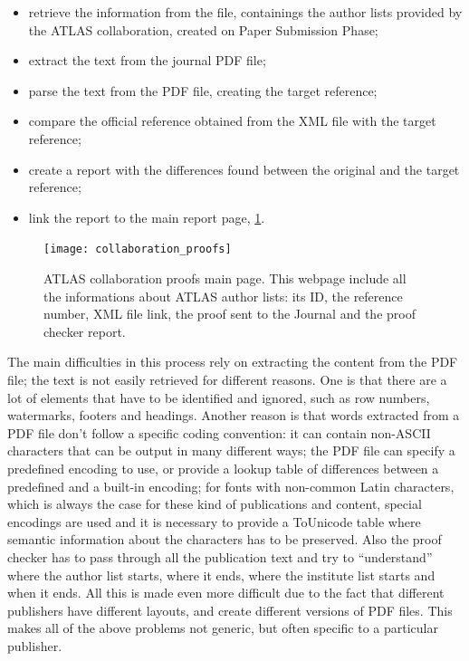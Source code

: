 \begin{itemize}
\item retrieve the information from the  file, containings the author lists provided by the ATLAS collaboration,  created on Paper Submission Phase;
\item extract the text from the journal PDF file;
\item parse the text from the PDF file, creating the target reference;
\item compare the official reference obtained from the XML file with the target reference;
\item create a report with the differences found between the original and the target reference;
\item link the report to the main report page, \cref{fig:collaboration_proofs}.
\end{itemize}

\begin{figure}[htb]
  \centering
  \texttt{[image: collaboration\_proofs]}
  \caption{ATLAS collaboration proofs main page. This webpage include all the informations about ATLAS author lists: its ID, the reference number, XML file link, the proof sent to the Journal and the proof checker report.}
  \label{fig:collaboration_proofs}
\end{figure}

The main difficulties in this process rely on extracting the content from the PDF file; the text is not easily retrieved for different reasons.
One is that there are a lot of elements that have to be identified and ignored, such as row numbers, watermarks, footers and headings.
Another reason is that words extracted from a PDF file don't follow a specific coding convention:
it can contain non-ASCII characters that can be output in many different ways;
the PDF file can specify a predefined encoding to use, or provide a lookup table of differences between a predefined and a built-in encoding;
for fonts with non-common Latin characters, which is always the case for these kind of publications and content,
special encodings are used and it is necessary to provide a ToUnicode table where semantic information about the characters has to be preserved.
Also the proof checker has to pass through all the publication text and try to \enquote{understand} where the author list starts, where it ends, where the institute list starts and when it ends.
All this is made even more difficult due to the fact that different publishers have different layouts, and create different versions of PDF files.
This makes all of the above problems not generic,
but often specific to a particular publisher.

